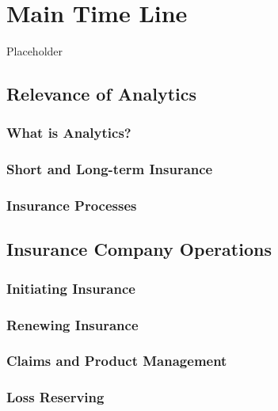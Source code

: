 \documentclass[]{book}
\theoremstyle{definition}
\theoremstyle{definition}
\theoremstyle{definition}
\theoremstyle{remark}
\begin{document}
\chapter{Main Time Line}\label{main-time-line}

Placeholder

\section{Relevance of Analytics}\label{S:Intro}

\subsection{What is Analytics?}\label{what-is-analytics}

\subsection{Short and Long-term
Insurance}\label{short-and-long-term-insurance}

\subsection{Insurance Processes}\label{S:InsProcesses}

\section{Insurance Company Operations}\label{S:PredModApps}

\subsection{Initiating Insurance}\label{initiating-insurance}

\subsection{Renewing Insurance}\label{renewing-insurance}

\subsection{Claims and Product
Management}\label{claims-and-product-management}

\subsection{Loss Reserving}\label{S:Reserving}
\end{document}

